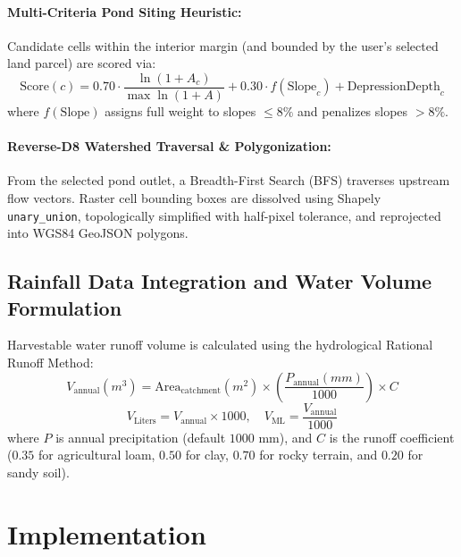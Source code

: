 \documentclass[manuscript,screen,review]{acmart}
\begin{document}
\paragraph{Multi-Criteria Pond Siting Heuristic:} Candidate cells within the interior margin (and bounded by the user's selected land parcel) are scored via:
\begin{equation}
\text{Score}(c) = 0.70 \cdot \frac{\ln(1 + A_c)}{\max \ln(1 + A)} + 0.30 \cdot f(\text{Slope}_c) + \text{DepressionDepth}_c
\end{equation}
where $f(\text{Slope})$ assigns full weight to slopes $\le 8\%$ and penalizes slopes $>8\%$.

\paragraph{Reverse-D8 Watershed Traversal \& Polygonization:} From the selected pond outlet, a Breadth-First Search (BFS) traverses upstream flow vectors. Raster cell bounding boxes are dissolved using Shapely \texttt{unary\_union}, topologically simplified with half-pixel tolerance, and reprojected into WGS84 GeoJSON polygons.

\subsection{Rainfall Data Integration and Water Volume Formulation}
Harvestable water runoff volume is calculated using the hydrological Rational Runoff Method:
\begin{equation}
V_{\text{annual}} (m^3) = \text{Area}_{\text{catchment}} (m^2) \times \left(\frac{P_{\text{annual}} (mm)}{1000}\right) \times C
\end{equation}
\begin{equation}
V_{\text{Liters}} = V_{\text{annual}} \times 1000, \quad V_{\text{ML}} = \frac{V_{\text{annual}}}{1000}
\end{equation}
where $P$ is annual precipitation (default $1000\text{ mm}$), and $C$ is the runoff coefficient ($0.35$ for agricultural loam, $0.50$ for clay, $0.70$ for rocky terrain, and $0.20$ for sandy soil).

\section{Implementation}
\label{sec:implementation}
\end{document}
